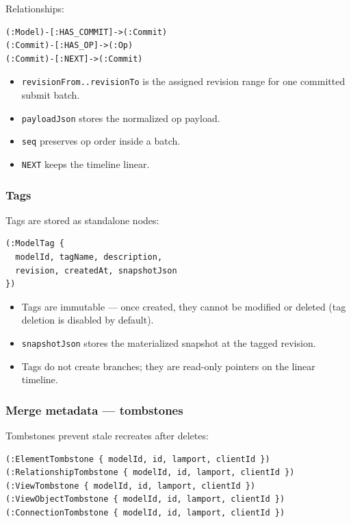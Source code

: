 Relationships:

\begin{lstlisting}[caption={Op-log relationships}]
(:Model)-[:HAS_COMMIT]->(:Commit)
(:Commit)-[:HAS_OP]->(:Op)
(:Commit)-[:NEXT]->(:Commit)
\end{lstlisting}

\begin{itemize}
\item \texttt{revisionFrom..revisionTo} is the assigned revision range for
  one committed submit batch.
\item \texttt{payloadJson} stores the normalized op payload.
\item \texttt{seq} preserves op order inside a batch.
\item \texttt{NEXT} keeps the timeline linear.
\end{itemize}

\subsubsection{Tags}

Tags are stored as standalone nodes:

\begin{lstlisting}[caption={Tag node}]
(:ModelTag {
  modelId, tagName, description,
  revision, createdAt, snapshotJson
})
\end{lstlisting}

\begin{itemize}
\item Tags are immutable --- once created, they cannot be modified or deleted
  (tag deletion is disabled by default).
\item \texttt{snapshotJson} stores the materialized snapshot at the tagged
  revision.
\item Tags do not create branches; they are read-only pointers on the linear
  timeline.
\end{itemize}

\subsubsection{Merge metadata --- tombstones}

Tombstones prevent stale recreates after deletes:

\begin{lstlisting}[caption={Tombstone nodes}]
(:ElementTombstone { modelId, id, lamport, clientId })
(:RelationshipTombstone { modelId, id, lamport, clientId })
(:ViewTombstone { modelId, id, lamport, clientId })
(:ViewObjectTombstone { modelId, id, lamport, clientId })
(:ConnectionTombstone { modelId, id, lamport, clientId })
\end{lstlisting}

